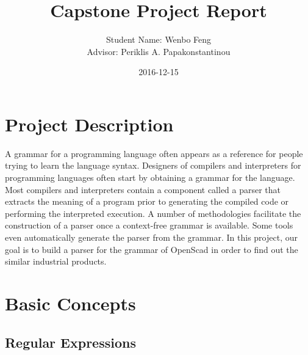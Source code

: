 \documentclass{article}
\title{Capstone Project Report}
\date{2016-12-15}
\author{Student Name: Wenbo Feng\\ Advisor: Periklis A. Papakonstantinou}
\begin{document}
\maketitle
{}
\newpage
{}

\section{Project Description }

A grammar for a programming language
often appears as a reference for people trying to learn the language syntax.
Designers of compilers and interpreters for programming languages often start
by obtaining a grammar for the language. Most compilers and interpreters contain
a component called a parser that extracts the meaning of a program prior to
generating the compiled code or performing the interpreted execution. A number
of methodologies facilitate the construction of a parser once a context-free
grammar is available. Some tools even automatically generate the parser from
the grammar. 
In this project, our goal is to build a parser for the grammar of OpenScad in order to find out the similar industrial products. 


\section{Basic Concepts }


\subsection{Regular Expressions}
\end{document}
